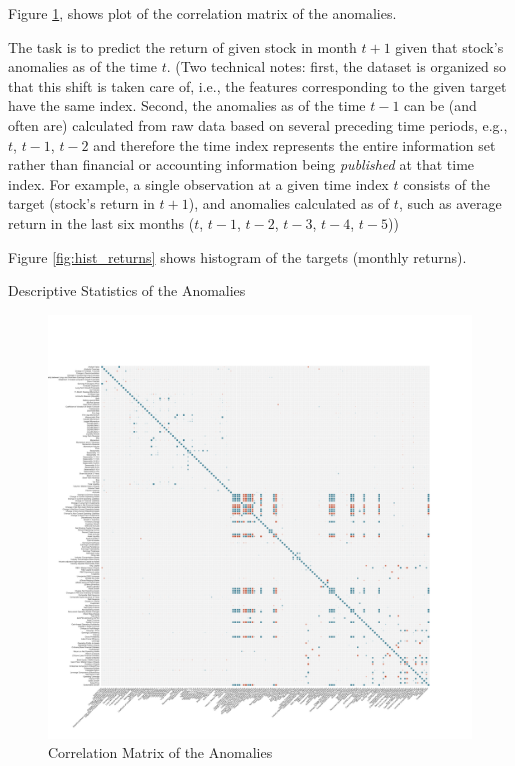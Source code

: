 	Figure \ref{fig:corrplot}, shows plot of the correlation matrix of the anomalies.

	The task is to predict the return of given stock in month $t+1$ given that stock's anomalies as of the time $t$. (Two technical notes: first, the dataset is organized so that this shift is taken care of, i.e., the features corresponding to the given target have the same index. Second, the anomalies as of the time $t-1$ can be (and often are) calculated from raw data based on several preceding time periods, e.g., $t$, $t-1$, $t-2$ and therefore the time index  represents the entire information set rather than financial or accounting information being \textit{published} at that time index. For example, a single observation at a given time index $t$ consists of the target (stock's return in $t+1$), and anomalies calculated as of $t$, such as average return in the last six months ($t$, $t-1$, $t-2$, $t-3$, $t-4$, $t-5$))
	
	Figure \ref{fig:hist_returns} shows histogram of the targets (monthly returns). 
	
	
	

	
	\begin{table}
		\resizebox{\textwidth}{!}{}
		\caption{Descriptive Statistics of the Anomalies}
		\label{tab:descr}
	\end{table}


	\begin{center}
		\begin{figure}
			\includegraphics[width=\textwidth,height=\textheight,keepaspectratio]{Figures/corrplot.pdf}
			\caption{Correlation Matrix of the Anomalies}
			\label{fig:corrplot}
		\end{figure}
	\end{center}
	

